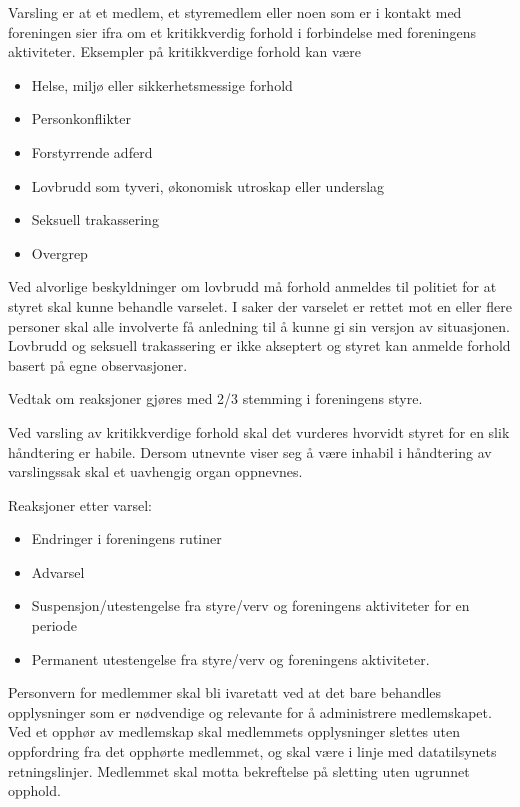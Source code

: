 \documentclass{rapport}
\begin{document}

Varsling er at et medlem, et styremedlem eller noen som er i kontakt med foreningen sier
ifra om et kritikkverdig forhold i forbindelse med foreningens aktiviteter.
Eksempler på kritikkverdige forhold kan være
\begin{itemize}
  \item Helse, miljø eller sikkerhetsmessige forhold
  \item Personkonflikter
  \item Forstyrrende adferd
  \item Lovbrudd som tyveri, økonomisk utroskap eller underslag
  \item Seksuell trakassering
  \item Overgrep
\end{itemize}

Ved alvorlige beskyldninger om lovbrudd må forhold anmeldes til politiet for at styret skal
kunne behandle varselet. I saker der varselet er rettet mot en eller flere personer skal alle
involverte få anledning til å kunne gi sin versjon av situasjonen. Lovbrudd og seksuell
trakassering er ikke akseptert og styret kan anmelde forhold basert på egne observasjoner.

Vedtak om reaksjoner gjøres med 2/3 stemming i foreningens styre.

Ved varsling av kritikkverdige forhold skal det vurderes hvorvidt styret for en slik håndtering
er habile. Dersom utnevnte viser seg å være inhabil i håndtering av varslingssak skal et
uavhengig organ oppnevnes.

Reaksjoner etter varsel:
\begin{itemize}
  \item Endringer i foreningens rutiner
  \item Advarsel
  \item Suspensjon/utestengelse fra styre/verv og foreningens aktiviteter for en periode
  \item Permanent utestengelse fra styre/verv og foreningens aktiviteter.
\end{itemize}


Personvern for medlemmer skal bli ivaretatt ved at det bare behandles opplysninger som er
nødvendige og relevante for å administrere medlemskapet. Ved et opphør av medlemskap
skal medlemmets opplysninger slettes uten oppfordring fra det opphørte medlemmet, og
skal være i linje med datatilsynets retningslinjer. Medlemmet skal motta bekreftelse på
sletting uten ugrunnet opphold.
\end{document}
